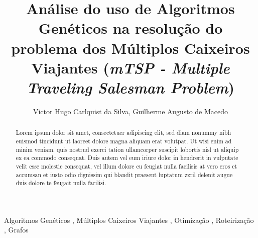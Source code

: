 \documentclass[final,5p,times,twocolumn]{elsarticle}
\begin{document}
\begin{frontmatter}



\title{Análise do uso de Algoritmos Genéticos na resolução do problema dos Múltiplos Caixeiros Viajantes (\textit{mTSP - Multiple Traveling Salesman Problem})}


\author{Victor Hugo Carlquist da Silva, Guilherme Augusto de Macedo}

\address{Campos do Jordão/SP}

\begin{abstract}
Lorem ipsum dolor sit amet, consectetuer adipiscing elit, sed diam nonummy nibh euismod tincidunt 
ut laoreet dolore magna aliquam erat volutpat. Ut wisi enim ad minim veniam, quis nostrud exerci 
tation ullamcorper suscipit lobortis nisl ut aliquip ex ea commodo consequat. Duis autem vel eum 
iriure dolor in hendrerit in vulputate velit esse molestie consequat, vel illum dolore eu feugiat 
nulla facilisis at vero eros et accumsan et iusto odio dignissim qui blandit praesent luptatum 
zzril delenit augue duis dolore te feugait nulla facilisi.

\end{abstract}

\begin{keyword}
Algoritmos Genéticos \sep 
Múltiplos Caixeiros Viajantes \sep 
Otimização \sep 
Roteirização \sep
Grafos

\end{keyword}

\end{frontmatter}
\end{document}
